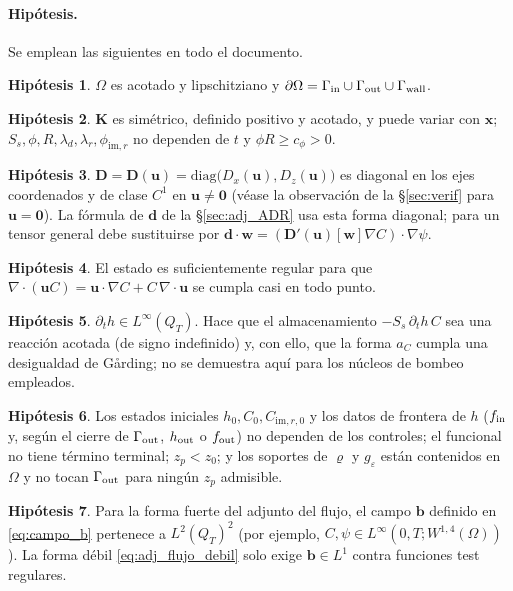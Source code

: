 \documentclass[11pt]{article}
\numberwithin{equation}{section}
\theoremstyle{plain}
\theoremstyle{definition}
\newtheorem{hyp}{Hipótesis}
\theoremstyle{remark}
\newcommand{\bu}{\mathbf{u}}
\newcommand{\bK}{\mathbf{K}}
\newcommand{\bD}{\mathbf{D}}
\newcommand{\bb}{\mathbf{b}}
\newcommand{\bd}{\mathbf{d}}
\newcommand{\bx}{\mathbf{x}}
\newcommand{\Ceps}{g_\varepsilon}              %
\newcommand{\Nuc}{\varrho}                      %
\newcommand{\im}{\mathrm{im}}
\begin{document}
\paragraph{Hipótesis.} Se emplean las siguientes en todo el documento.
\begin{hyp}\label{hyp:dominio} $\Omega$ es acotado y lipschitziano y $\partial\Omega=\Gamma_{\rm in}\cup\Gamma_{\rm out}\cup\Gamma_{\rm wall}$.\end{hyp}
\begin{hyp}\label{hyp:coef} $\bK$ es simétrico, definido positivo y acotado, y puede variar con $\bx$; $S_s,\phi,R,\lambda_d,\lambda_r,\phi_{\im,r}$ no dependen
de $t$ y $\phi R\ge c_\phi>0$.\end{hyp}
\begin{hyp}\label{hyp:disp} $\bD=\bD(\bu)=\mathrm{diag}\bigl(D_x(\bu),D_z(\bu)\bigr)$ es diagonal en los ejes coordenados y de clase $C^1$ en $\bu\ne\mathbf 0$ (véase
la observación de la \S\ref{sec:verif} para $\bu=\mathbf 0$). La fórmula de $\bd$ de la \S\ref{sec:adj_ADR} usa esta forma diagonal; para un tensor
general debe sustituirse por $\bd\cdot\mathbf w=(\bD'(\bu)[\mathbf w]\nabla C)\cdot\nabla\psi$.\end{hyp}
\begin{hyp}\label{hyp:reg} El estado es suficientemente regular para que $\nabla\!\cdot(\bu C)=\bu\cdot\nabla C+C\,\nabla\!\cdot\bu$
se cumpla casi en todo punto.\end{hyp}
\begin{hyp}\label{hyp:dth} $\partial_th\in L^\infty(Q_T)$. Hace que el almacenamiento $-S_s\,\partial_th\,C$ sea una reacción acotada
(de signo indefinido) y, con ello, que la forma $a_C$ cumpla una desigualdad de G\aa rding; no se demuestra aquí
para los núcleos de bombeo empleados.\end{hyp}
\begin{hyp}\label{hyp:datos} Los estados iniciales $h_0,C_0,C_{\im,r,0}$ y los datos de frontera de $h$ ($f_{\rm in}$ y, según el cierre de $\Gamma_{\rm out}$, $h_{\rm out}$ o $f_{\rm out}$)
no dependen de los controles; el funcional no tiene término terminal; $z_p<z_0$; y los soportes de $\Nuc$ y $\Ceps$ están contenidos en $\Omega$ y no
tocan $\Gamma_{\rm out}$ para ningún $z_p$ admisible.\end{hyp}
\begin{hyp}\label{hyp:badj} Para la forma fuerte del adjunto del flujo, el campo $\bb$ definido en \eqref{eq:campo_b} pertenece a $L^2(Q_T)^2$ (por ejemplo,
$C,\psi\in L^\infty(0,T;W^{1,4}(\Omega))$). La forma débil \eqref{eq:adj_flujo_debil} solo exige $\bb\in L^1$ contra funciones test regulares.\end{hyp}
\end{document}
